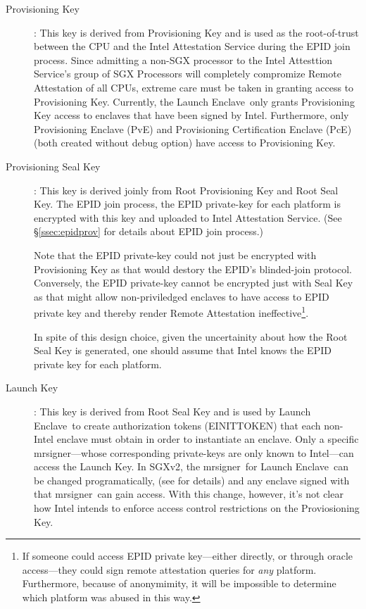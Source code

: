 \documentclass[11pt]{article}
\newcommand{\secref}[1]{\S\ref{#1}}
\newcommand{\mrsigner}{\textsf{mrsigner}}
\newcommand{\pve}{\textsf{PvE}}
\newcommand{\pce}{\textsf{PcE}}
\newcommand{\launchenclave}{\textsf{Launch Enclave}}
\begin{document}
  \begin{description}
    \item[Provisioning Key]: This key is derived from
      Provisioning Key and is used as the root-of-trust
      between the CPU and the Intel Attestation Service during the
      EPID join process. Since admitting a non-SGX processor to
      the Intel Attesttion Service's group of SGX Processors will
      completely compromize Remote Attestation of all CPUs, extreme
      care must be taken in granting access to Provisioning Key.
      Currently, the \launchenclave\ only grants Provisioning Key
      access to enclaves that have been signed by Intel. Furthermore,
      only Provisioning Enclave (\pve) and Provisioning Certification
      Enclave (\pce) (both created without debug option) have access to
      Provisioning Key.

    \item[Provisioning Seal Key]: This key is derived joinly from Root
      Provisioning Key and Root Seal Key. The EPID join process, the
      EPID private-key for each platform is encrypted with this key
      and uploaded to Intel Attestation Service. (See \secref{ssec:epidprov}
      for details about EPID join process.)

      Note that the EPID private-key could not just be encrypted with
      Provisioning Key as that would destory the EPID's blinded-join
      protocol. Conversely, the EPID private-key cannot be encrypted
      just with Seal Key as that might allow non-priviledged enclaves
      to have access to EPID private key and thereby render Remote
      Attestation ineffective\footnote{If someone could access EPID
      private key---either directly, or through oracle access---they
      could sign remote attestation queries for \textit{any}
      platform. Furthermore, because of anonymimity, it will be
      impossible to determine which platform was abused in this way.}.

      In spite of this design choice, given the uncertainity about
      how the Root Seal Key is generated, one should assume that
      Intel knows the EPID private key for each platform.

      \item[Launch Key]: This key is derived from Root Seal Key and
      is used by \launchenclave\ to create authorization tokens
      (\textsf{EINITTOKEN}) that each non-Intel enclave must obtain
      in order to instantiate an enclave. Only a specific
      \mrsigner---whose corresponding private-keys are only known
      to Intel---can access the Launch Key. In SGXv2, the \mrsigner\
      for \launchenclave\ can be changed programatically,
      (see \cite[\S39.1.4]{intelsdm} for details) and any enclave
      signed with that \mrsigner\ can gain access. With
      this change, however, it's not clear how Intel intends
      to enforce access control restrictions on the
      Proviosioning Key.


\end{description}
\end{document}
